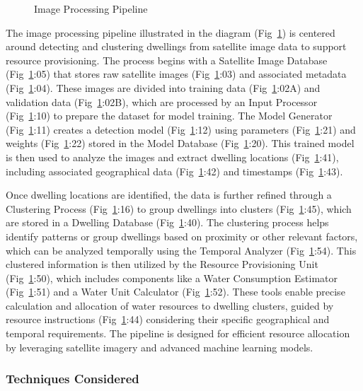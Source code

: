 \documentclass[10pt]{article}
\begin{document}
\begin{figure} [H]
    \centering
    
    \caption{Image Processing Pipeline}
    \label{fig:pipeline}
\end{figure}

The image processing pipeline illustrated in the diagram (Fig~\ref{fig:pipeline}) is centered around detecting and clustering dwellings from satellite image data to support resource provisioning. The process begins with a Satellite Image Database (Fig~\ref{fig:pipeline}:05) that stores raw satellite images (Fig~\ref{fig:pipeline}:03) and associated metadata (Fig~\ref{fig:pipeline}:04). These images are divided into training data (Fig~\ref{fig:pipeline}:02A) and validation data (Fig~\ref{fig:pipeline}:02B), which are processed by an Input Processor (Fig~\ref{fig:pipeline}:10) to prepare the dataset for model training. The Model Generator (Fig~\ref{fig:pipeline}:11) creates a detection model (Fig~\ref{fig:pipeline}:12) using parameters (Fig~\ref{fig:pipeline}:21) and weights (Fig~\ref{fig:pipeline}:22) stored in the Model Database (Fig~\ref{fig:pipeline}:20). This trained model is then used to analyze the images and extract dwelling locations (Fig~\ref{fig:pipeline}:41), including associated geographical data (Fig~\ref{fig:pipeline}:42) and timestamps (Fig~\ref{fig:pipeline}:43).

Once dwelling locations are identified, the data is further refined through a Clustering Process (Fig~\ref{fig:pipeline}:16) to group dwellings into clusters (Fig~\ref{fig:pipeline}:45), which are stored in a Dwelling Database (Fig~\ref{fig:pipeline}:40). The clustering process helps identify patterns or group dwellings based on proximity or other relevant factors, which can be analyzed temporally using the Temporal Analyzer (Fig~\ref{fig:pipeline}:54). This clustered information is then utilized by the Resource Provisioning Unit (Fig~\ref{fig:pipeline}:50), which includes components like a Water Consumption Estimator (Fig~\ref{fig:pipeline}:51) and a Water Unit Calculator (Fig~\ref{fig:pipeline}:52). These tools enable precise calculation and allocation of water resources to dwelling clusters, guided by resource instructions (Fig~\ref{fig:pipeline}:44) considering their specific geographical and temporal requirements. The pipeline is designed for efficient resource allocation by leveraging satellite imagery and advanced machine learning models.

\subsubsection{Techniques Considered}
\end{document}
